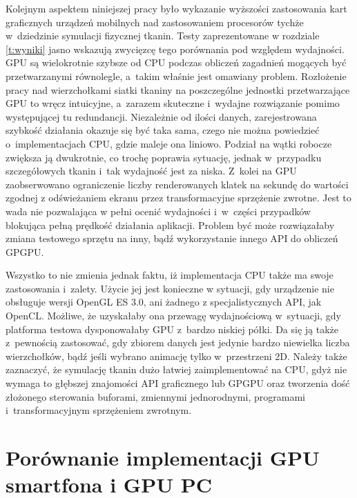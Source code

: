 	
	Kolejnym aspektem niniejszej pracy było wykazanie wyższości zastosowania kart graficznych urządzeń mobilnych nad zastosowaniem procesorów tychże w~dziedzinie symulacji fizycznej tkanin. Testy zaprezentowane w rozdziale \ref{t:wyniki} jasno wskazują zwycięzcę tego porównania pod względem wydajności. GPU są wielokrotnie szybsze od CPU podczas obliczeń zagadnień mogących być przetwarzanymi równolegle, a~takim właśnie jest omawiany problem. Rozłożenie pracy nad wierzchołkami siatki tkaniny na poszczególne jednostki przetwarzające GPU to wręcz intuicyjne, a~zarazem skuteczne i~wydajne rozwiązanie pomimo występującej tu redundancji. Niezależnie od ilości danych, zarejestrowana szybkość działania okazuje się być taka sama, czego nie można powiedzieć o~implementacjach CPU, gdzie maleje ona liniowo. Podział na wątki robocze zwiększa ją dwukrotnie, co trochę poprawia sytuację, jednak w~przypadku szczegółowych tkanin i~tak wydajność jest za niska. Z~kolei na GPU zaobserwowano ograniczenie liczby renderowanych klatek na sekundę do wartości zgodnej z odświeżaniem ekranu przez transformacyjne sprzężenie zwrotne. Jest to wada nie pozwalająca w pełni ocenić wydajności i~w~części przypadków blokująca pełną prędkość działania aplikacji. Problem być może rozwiązałaby zmiana testowego sprzętu na inny, bądź wykorzystanie innego API do obliczeń GPGPU.
	
	Wszystko to nie zmienia jednak faktu, iż implementacja CPU także ma swoje zastosowania i~zalety. Użycie jej jest konieczne w sytuacji, gdy urządzenie nie obsługuje wersji OpenGL ES 3.0, ani żadnego z specjalistycznych API, jak OpenCL. Możliwe, że uzyskałaby ona przewagę wydajnościową w~sytuacji, gdy platforma testowa dysponowałaby GPU z~bardzo niskiej półki. Da się ją także z~pewnością zastosować, gdy zbiorem danych jest jedynie bardzo niewielka liczba wierzchołków, bądź jeśli wybrano animację tylko w~przestrzeni 2D. Należy także zaznaczyć, że symulację tkanin dużo łatwiej zaimplementować na CPU, gdyż nie wymaga to głębszej znajomości API graficznego lub GPGPU oraz tworzenia dość złożonego sterowania buforami, zmiennymi jednorodnymi, programami i~transformacyjnym sprzężeniem zwrotnym.
	
	\section{Porównanie implementacji GPU smartfona i GPU PC}
	\label{t:wnioski:andro_vs_pc}
	

